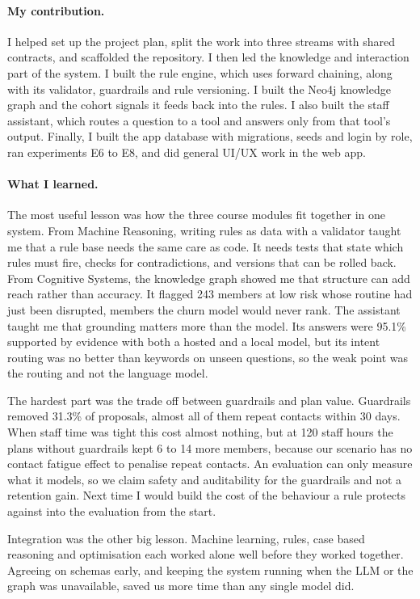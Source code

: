 \paragraph{My contribution.} I helped set up the project plan, split the work into three streams with shared contracts, and scaffolded the repository. I then led the knowledge and interaction part of the system. I built the rule engine, which uses forward chaining, along with its validator, guardrails and rule versioning. I built the Neo4j knowledge graph and the cohort signals it feeds back into the rules. I also built the staff assistant, which routes a question to a tool and answers only from that tool's output. Finally, I built the app database with migrations, seeds and login by role, ran experiments E6 to E8, and did general UI/UX work in the web app.

\paragraph{What I learned.} The most useful lesson was how the three course modules fit together in one system. From Machine Reasoning, writing rules as data with a validator taught me that a rule base needs the same care as code. It needs tests that state which rules must fire, checks for contradictions, and versions that can be rolled back. From Cognitive Systems, the knowledge graph showed me that structure can add reach rather than accuracy. It flagged 243 members at low risk whose routine had just been disrupted, members the churn model would never rank. The assistant taught me that grounding matters more than the model. Its answers were 95.1\% supported by evidence with both a hosted and a local model, but its intent routing was no better than keywords on unseen questions, so the weak point was the routing and not the language model.

The hardest part was the trade off between guardrails and plan value. Guardrails removed 31.3\% of proposals, almost all of them repeat contacts within 30 days. When staff time was tight this cost almost nothing, but at 120 staff hours the plans without guardrails kept 6 to 14 more members, because our scenario has no contact fatigue effect to penalise repeat contacts. An evaluation can only measure what it models, so we claim safety and auditability for the guardrails and not a retention gain. Next time I would build the cost of the behaviour a rule protects against into the evaluation from the start.

Integration was the other big lesson. Machine learning, rules, case based reasoning and optimisation each worked alone well before they worked together. Agreeing on schemas early, and keeping the system running when the LLM or the graph was unavailable, saved us more time than any single model did.

